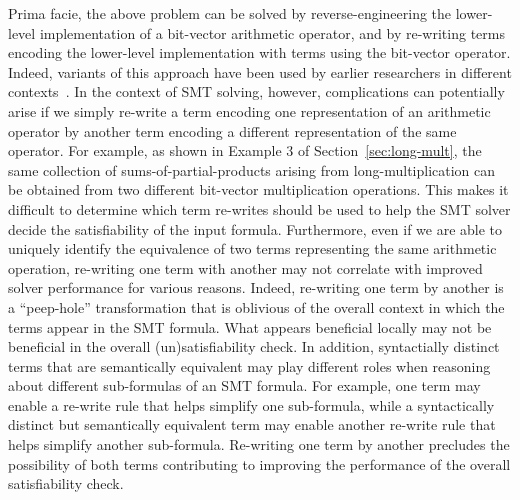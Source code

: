 \vspace{0.2 cm}
Prima facie, the above problem can be solved by reverse-engineering
the lower-level implementation of a bit-vector arithmetic operator,
and by re-writing terms encoding the lower-level implementation with
terms using the bit-vector operator.  Indeed, variants of this
approach have been used by earlier researchers in different
contexts~\cite{kunz,ciesielski,kolbl,reveng,earlier-pat-match-synopsys}.
In the context of SMT solving, however, complications can potentially
arise if we simply re-write a term encoding one representation of an
arithmetic operator by another term encoding a different
representation of the same operator. For example, as shown in Example
$3$ of Section~\ref{sec:long-mult}, the same collection of
sums-of-partial-products arising from long-multiplication can be
obtained from two different bit-vector multiplication operations.
This makes it difficult to determine which term re-writes should be
used to help the SMT solver decide the satisfiability of the input
formula.  Furthermore, even if we are able to uniquely identify the
equivalence of two terms representing the same arithmetic operation,
re-writing one term with another may not correlate with improved solver
performance for various reasons.  Indeed, re-writing one term by
another is a ``peep-hole'' transformation that is oblivious of the
overall context in which the terms appear in the SMT formula.  What
appears beneficial locally may not be beneficial in the overall
(un)satisfiability check.  In addition, syntactially distinct terms
that are semantically equivalent may play different roles when
reasoning about different sub-formulas of an SMT formula.  For
example, one term may enable a re-write rule that helps simplify one
sub-formula, while a syntactically distinct but semantically
equivalent term may enable another re-write rule that helps simplify
another sub-formula. Re-writing one term by another precludes the
possibility of both terms contributing to improving the performance of
the overall satisfiability check.

